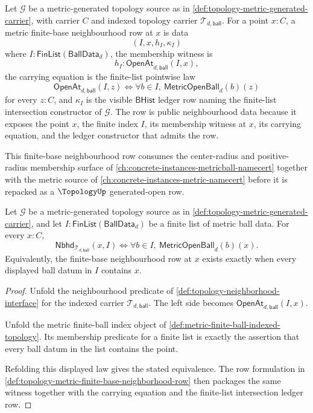 \begin{definition}
\label{def:topology-metric-finite-base-neighborhood-row}
Let $\mathcal{G}$ be a metric-generated topology source as in \autoref{def:topology-metric-generated-carrier}, with carrier $C$ and indexed topology carrier $\mathcal{T}_{d,\mathsf{ball}}$. For a point $x:C$, a metric finite-base neighbourhood row at $x$ is data
$$
(I,x,h_I,\kappa_I)
$$
where $I:\mathsf{FinList}(\mathsf{BallData}_d)$, the membership witness is
$$
h_I:\mathsf{OpenAt}_{d,\mathsf{ball}}(I,x),
$$
the carrying equation is the finite-list pointwise law
$$
\mathsf{OpenAt}_{d,\mathsf{ball}}(I,z)
\Longleftrightarrow
\forall b\in I,\ \mathsf{MetricOpenBall}_d(b)(z)
$$
for every $z:C$, and $\kappa_I$ is the visible $\mathsf{BHist}$ ledger row naming the finite-list intersection constructor of $\mathcal{G}$. The row is public neighbourhood data because it exposes the point $x$, the finite index $I$, its membership witness at $x$, its carrying equation, and the ledger constructor that admits the row.
\end{definition}

This finite-base neighbourhood row consumes the center-radius and positive-radius membership surface of \autoref{ch:concrete-instances-metricball-namecert} together with the metric source of \autoref{ch:concrete-instances-metric-namecert} before it is repacked as a $\TopologyUp$ generated-open row.

\begin{theorem}
\label{thm:topology-metric-finite-base-neighborhood-decomposition}
Let $\mathcal{G}$ be a metric-generated topology source as in \autoref{def:topology-metric-generated-carrier}, and let $I:\mathsf{FinList}(\mathsf{BallData}_d)$ be a finite list of metric ball data. For every $x:C$,
$$
\mathsf{Nbhd}_{\mathcal{T}_{d,\mathsf{ball}}}(x,I)
\Longleftrightarrow
\forall b\in I,\ \mathsf{MetricOpenBall}_d(b)(x).
$$
Equivalently, the finite-base neighbourhood row at $x$ exists exactly when every displayed ball datum in $I$ contains $x$.
\end{theorem}
\begin{proof}
Unfold the neighbourhood predicate of \autoref{def:topology-neighborhood-interface} for the indexed carrier $\mathcal{T}_{d,\mathsf{ball}}$. The left side becomes $\mathsf{OpenAt}_{d,\mathsf{ball}}(I,x)$.

Unfold the metric finite-ball index object of \autoref{def:metric-finite-ball-indexed-topology}. Its membership predicate for a finite list is exactly the assertion that every ball datum in the list contains the point.

Refolding this displayed law gives the stated equivalence. The row formulation in \autoref{def:topology-metric-finite-base-neighborhood-row} then packages the same witness together with the carrying equation and the finite-list intersection ledger row.
\end{proof}

